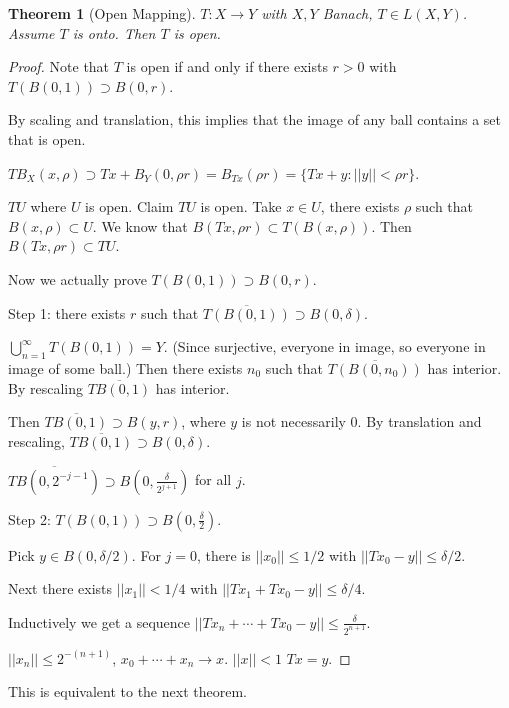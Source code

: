 \documentclass[11pt]{article}
\newtheorem{thm}{Theorem}[section]
\newcommand{\ov}[1]{\overline{#1}}
\newcommand{\cd}{\cdots}
\newcommand{\ra}{\rightarrow}
\newcommand{\sbs}{\subset}
\newcommand{\sps}{\supset}
\newcommand{\de}{\delta}
\newcommand{\bcu}[2]{\bigcup_{#1}^{#2}}
\newcommand{\fr}[2]{\frac{#1}{#2}}
\begin{document}
\begin{thm}[Open Mapping]
$T:X\ra Y$ with $X,Y$ Banach, $T\in L(X,Y)$. Assume $T$ is onto. Then $T$ is open. 
\end{thm}
\begin{proof}
Note that $T$ is open if and only if there exists $r>0$ with $T(B(0,1))\sps B(0,r)$. 

By scaling and translation, this implies that the image of any ball contains a set that is open. 

$TB_X(x,\rho)\sps Tx+B_Y(0,\rho r)=B_{Tx}(\rho r)=\{Tx+y:||y||<\rho r\}$.

$TU$ where $U$ is open. Claim $TU$ is open. Take $x\in U$, there exists $\rho$ such that $B(x,\rho)\sbs U$. We know that $B(Tx,\rho r)\sbs T(B(x,\rho))$. Then $B(Tx,\rho r)\sbs TU$. 

Now we actually prove $T(B(0,1))\sps B(0,r)$. 

Step 1: there exists $r$ such that $\ov{T(B(0,1))}\sps B(0,\de)$. 

$\bcu{n=1}{\infty}T(B(0,1))=Y$. (Since surjective, everyone in image, so everyone in image of some ball.) Then there exists $n_0$ such that $\ov{T(B(0,n_0))}$ has interior. By rescaling $\ov{TB(0,1)}$ has interior. 

Then $\ov{TB(0,1)}\sps B(y,r)$, where $y$ is not necessarily 0. By translation and rescaling, $\ov{TB(0,1)}\sps B(0,\de)$. 

$\ov{TB(0,2^{-j-1})}\sps B(0,\fr{\de}{2^{j+1}})$ for all $j$.

Step 2: $T(B(0,1))\sps B(0,\fr{\de}{2})$. 

Pick $y\in B(0,\de/2)$. For $j=0$, there is $||x_0||\le 1/2$ with $||Tx_0-y||\le \de/2$. 

Next there exists $||x_1||<1/4$ with $||Tx_1+Tx_0-y||\le\de/4$. 

Inductively we get a sequence $||Tx_n+\cd+Tx_0-y||\le\fr{\de}{2^{n+1}}$. 

$||x_n||\le 2^{-(n+1)}$, $x_0+\cd+x_n\ra x$. $||x||<1$ $Tx=y$. 
\end{proof}

This is equivalent to the next theorem.
\end{document}
